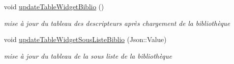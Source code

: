 \begin{DoxyCompactItemize}
\mbox{\label{classMainWindow_a3d2244f7cd6754e296d550a8774db184}} 
void \hyperlink{classMainWindow_a3d2244f7cd6754e296d550a8774db184}{update\+Table\+Widget\+Biblio} ()
\begin{DoxyCompactList}\small\item\em mise à jour du tableau des descripteurs après chargement de la bibliothèque \end{DoxyCompactList}\item 
\mbox{\label{classMainWindow_a2c69407063bbc24fae04879a40fd762d}} 
void \hyperlink{classMainWindow_a2c69407063bbc24fae04879a40fd762d}{update\+Table\+Widget\+Sous\+Liste\+Biblio} (Json\+::\+Value)
\begin{DoxyCompactList}\small\item\em mise à jour du tableau de la sous liste de la bibliothèque \end{DoxyCompactList}\end{DoxyCompactItemize}

